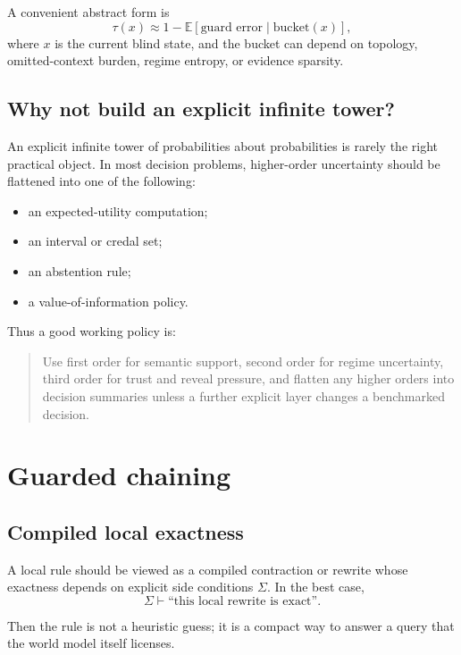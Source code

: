 \documentclass[11pt]{article}
\newcommand{\sigmactx}{\Sigma}
\newcommand{\E}{\mathbb{E}}
\begin{document}
A convenient abstract form is
\begin{equation}
\tau(x) \approx 1 - \E[\text{guard error} \mid \text{bucket}(x)],
\end{equation}
where $x$ is the current blind state, and the bucket can depend on topology, omitted-context burden, regime entropy, or evidence sparsity.

\subsection{Why not build an explicit infinite tower?}
An explicit infinite tower of probabilities about probabilities is rarely the right practical object. In most decision problems, higher-order uncertainty should be flattened into one of the following:
\begin{itemize}
    \item an expected-utility computation;
    \item an interval or credal set;
    \item an abstention rule;
    \item a value-of-information policy.
\end{itemize}

Thus a good working policy is:
\begin{quote}
Use first order for semantic support, second order for regime uncertainty, third order for trust and reveal pressure, and flatten any higher orders into decision summaries unless a further explicit layer changes a benchmarked decision.
\end{quote}

\section{Guarded chaining}
\subsection{Compiled local exactness}
A local rule should be viewed as a compiled contraction or rewrite whose exactness depends on explicit side conditions $\sigmactx$. In the best case,
\begin{equation}
\sigmactx \vdash \text{``this local rewrite is exact''}.
\end{equation}

Then the rule is not a heuristic guess; it is a compact way to answer a query that the world model itself licenses.
\end{document}

